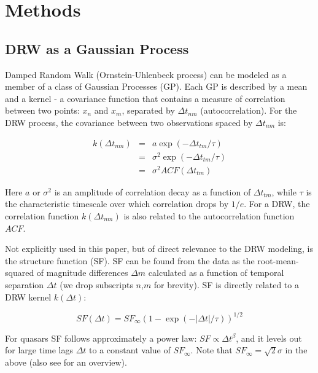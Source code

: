 \documentclass[twocolumn]{aastex62}
\begin{document}
%
%
\section{Methods}\label{sec:methods}
\subsection{DRW as a Gaussian Process}
Damped Random Walk (Ornstein-Uhlenbeck process) can be modeled as a member of a class of Gaussian Processes (GP). Each GP is described by a mean and a kernel - a covariance function that contains a measure of correlation between two points: $x_{n}$ and $x_{m}$, separated by $\Delta t_{nm}$ (autocorrelation). For the  DRW process, the covariance  between two observations spaced by  $\Delta t_{nm}$ is: 

\begin{eqnarray}
k(\Delta t_{nm}) &=& a \exp{(-\Delta t_{tm} / \tau)} \\
                 &=& \sigma^{2}\exp{(-\Delta t_{tm} / \tau)}  \\
                 &=& \sigma^{2} ACF(\Delta t_{tm})
\end{eqnarray} 

Here $a$ or $\sigma^{2}$ is an amplitude of correlation decay as a function of $\Delta t_{tm}$,  while $\tau$ is the characteristic timescale over which correlation drops by $1/e$. For a DRW,  the correlation function $k(\Delta t_{nm})$ is also related to the autocorrelation function $ACF$. 

Not explicitly used in this paper, but of direct relevance to the DRW modeling, is the structure function (SF). SF can be found from the data as the root-mean-squared of  magnitude differences $\Delta m$  calculated as a function of temporal separation $\Delta t$ (we drop subscripts $n$,$m$ for brevity). SF is directly related to a DRW kernel $k(\Delta t)$:

\begin{equation}
SF(\Delta t) = SF_{\infty} (1-\exp{(-|\Delta t|/\tau)})^{1/2}
\end{equation}

For quasars SF follows approximately a power law: $SF \propto \Delta t^{\beta}$,  and it levels out for large time lags $\Delta t$ to a constant value of $SF_{\infty}$.   Note that $SF_\infty = \sqrt{2} \sigma$  in the above (also see \citet{macleod2012, bauer2009, graham2015a} for an overview).
\end{document}
